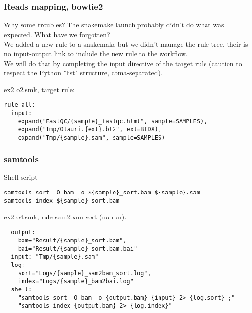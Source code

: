 \begin{frame}[containsverbatim]
\frametitle{Reads mapping, bowtie2}
\begin{exampleblock}{Why some troubles?}
The snakemake launch probably didn't do what was expected. 
What have we forgotten? \\
We added a new rule to a snakemake but we didn't manage the rule tree, their is no input-output link to include the new rule to the workflow.\\
We will do that by completing the input directive of the target rule (caution to respect the Python "list" structure, coma-separated).
\end{exampleblock}
\begin{exampleblock}{ex2$\_$o2.smk, target rule:}
\begin{lstlisting}
rule all:
  input:
    expand("FastQC/{sample}_fastqc.html", sample=SAMPLES),
    expand("Tmp/Otauri.{ext}.bt2", ext=BIDX),
    expand("Tmp/{sample}.sam", sample=SAMPLES)
\end{lstlisting}
\end{exampleblock}
\end{frame}
\begin{frame}[containsverbatim]
\frametitle{samtools}
\begin{exampleblock}{Shell script}
\begin{lstlisting}
samtools sort -O bam -o ${sample}_sort.bam ${sample}.sam
samtools index ${sample}_sort.bam
\end{lstlisting}
\end{exampleblock}
\begin{exampleblock}{ex2$\_$o4.smk, rule sam2bam$\_$sort (no run):}
\begin{lstlisting}
  output:
    bam="Result/{sample}_sort.bam",
    bai="Result/{sample}_sort.bam.bai"
  input: "Tmp/{sample}.sam"
  log:
    sort="Logs/{sample}_sam2bam_sort.log",
    index="Logs/{sample}_bam2bai.log"
  shell: 
    "samtools sort -O bam -o {output.bam} {input} 2> {log.sort} ;"
    "samtools index {output.bam} 2> {log.index}"
\end{lstlisting}
\end{exampleblock}
\end{frame}
